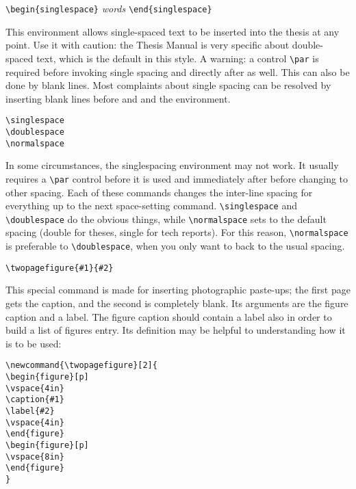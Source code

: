 \medskip

\verb|\begin{singlespace}| {\em words} \verb|\end{singlespace}|

\noindent This environment allows single-spaced text to be inserted into
the thesis at any point. Use it with caution: the Thesis Manual is very
specific about double-spaced text, which is the default in this style. A
warning: a control \verb"\par" is required before invoking single
spacing and directly after as well. This can also be done by blank
lines. Most complaints about single spacing can be resolved by inserting
blank lines before and and the environment.


\medskip

\verb|\singlespace|\\
\verb|\doublespace|\\
\verb|\normalspace|

\noindent In some circumstances, the singlespacing environment may not
work. It usually requires a \verb"\par" control before it is used and
immediately after before changing to other spacing. Each of these
commands changes the inter-line spacing for everything up to the next
space-setting command. \verb|\singlespace| and \verb|\doublespace| do
the obvious things, while \verb|\normalspace| sets to the default
spacing (double for theses, single for tech reports).  For this reason,
\verb|\normalspace| is preferable to \verb|\doublespace|, when you only
want to back to the usual spacing.

\medskip

\verb|\twopagefigure{#1}{#2}|

\noindent
This special command is made for inserting photographic paste-ups; the
first page gets the caption, and the second is completely blank. Its
arguments are the figure caption and a label. The figure caption should
contain a label also in order to build a list of figures entry. Its
definition may be helpful to understanding how it is to be used:

\begin{verbatim}
\newcommand{\twopagefigure}[2]{
\begin{figure}[p]
\vspace{4in}
\caption{#1}
\label{#2}
\vspace{4in}
\end{figure}
\begin{figure}[p]
\vspace{8in}
\end{figure}
}
\end{verbatim}


